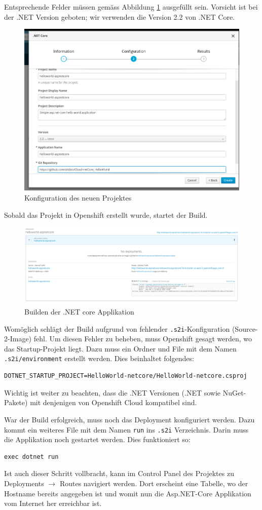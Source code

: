 \documentclass[12pt,a4paper]{article}
\begin{document}
Entsprechende Felder müssen gemäss Abbildung \ref{fig:os-new-config} ausgefüllt sein. Vorsicht ist bei der .NET Version geboten; wir verwenden die Version 2.2 von .NET Core. 
\begin{figure}[h]
	\centering
	\includegraphics[width=0.7\linewidth]{img/os-new-config}
	\caption{Konfiguration des neuen Projektes}
	\label{fig:os-new-config}
\end{figure}

Sobald das Projekt in Openshift erstellt wurde, startet der Build. 
\begin{figure}[h]
	\centering
	\includegraphics[width=0.7\linewidth]{img/os-building}
	\caption{Builden der .NET core Applikation}
	\label{fig:os-building}
\end{figure}
Womöglich schlägt der Build aufgrund von fehlender \texttt{.s2i}-Konfiguration (Source-2-Image) fehl. Um diesen Fehler zu beheben, muss Openshift gesagt werden, wo das Startup-Projekt liegt. Dazu muss ein Ordner und File mit dem Namen \texttt{.s2i/environment} erstellt werden. Dies beinhaltet folgendes:
\begin{lstlisting}[breaklines=true]
DOTNET_STARTUP_PROJECT=HelloWorld-netcore/HelloWorld-netcore.csproj
\end{lstlisting}
Wichtig ist weiter zu beachten, dass die .NET Versionen (.NET sowie NuGet-Pakete) mit denjenigen von Openshift Cloud kompatibel sind. 

War der Build erfolgreich, muss noch das Deployment konfiguriert werden. Dazu kommt ein weiteres File mit dem Namen \texttt{run} ins \texttt{.s2i} Verzeichnis. Darin muss die Applikation noch gestartet werden. Dies funktioniert so:
\begin{lstlisting}
exec dotnet run
\end{lstlisting}
Ist auch dieser Schritt vollbracht, kann im Control Panel des Projektes zu Deployments $\rightarrow$ Routes navigiert werden. Dort erscheint eine Tabelle, wo der Hostname bereits angegeben ist und womit nun die Asp.NET-Core Applikation vom Internet her erreichbar ist.
\end{document}
